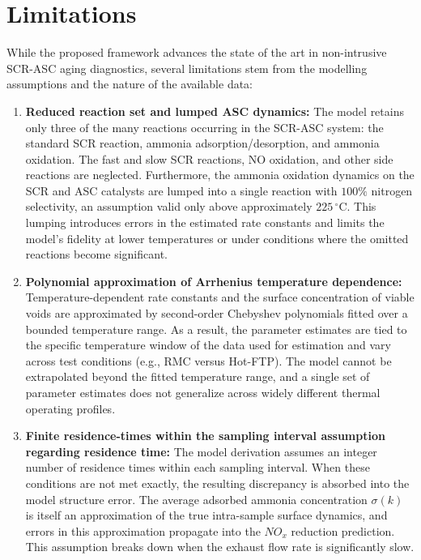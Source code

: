 \section{Limitations}

While the proposed framework advances the state of the art in non-intrusive SCR-ASC aging diagnostics, several
limitations stem from the modelling assumptions and the nature of the available data:

\begin{enumerate}
    \item \textbf{Reduced reaction set and lumped ASC dynamics:}
    The model retains only three of the many reactions occurring in the SCR-ASC system: the standard SCR reaction,
    ammonia adsorption/desorption, and ammonia oxidation. The fast and slow SCR reactions, NO oxidation, and other
    side reactions are neglected. Furthermore, the ammonia oxidation dynamics on the SCR and ASC catalysts are lumped
    into a single reaction with $100\%$ nitrogen selectivity, an assumption valid only above approximately
    $225\,^{\circ}\text{C}$. This lumping introduces errors in the estimated rate constants and limits the model's
    fidelity at lower temperatures or under conditions where the omitted reactions become significant.

    \item \textbf{Polynomial approximation of Arrhenius temperature dependence:}
    Temperature-dependent rate constants and the surface concentration of viable voids are approximated by
    second-order Chebyshev polynomials fitted over a bounded temperature range. As a result, the parameter estimates
    are tied to the specific temperature window of the data used for estimation and vary across test conditions (e.g.,
    RMC versus Hot-FTP). The model cannot be extrapolated beyond the fitted temperature range, and a single set of
    parameter estimates does not generalize across widely different thermal operating profiles.

    \item \textbf{Finite residence-times within the sampling interval assumption regarding residence time:}
    The model derivation assumes an integer number of residence times within
    each sampling interval. When these conditions are not met exactly, the
    resulting discrepancy is absorbed into the model structure error. The
    average adsorbed ammonia concentration $\sigma(k)$ is itself an
    approximation of the true intra-sample surface dynamics, and errors in this
    approximation propagate into the $NO_x$ reduction prediction. This
    assumption breaks down when the exhaust flow rate is significantly slow.


\end{enumerate}
